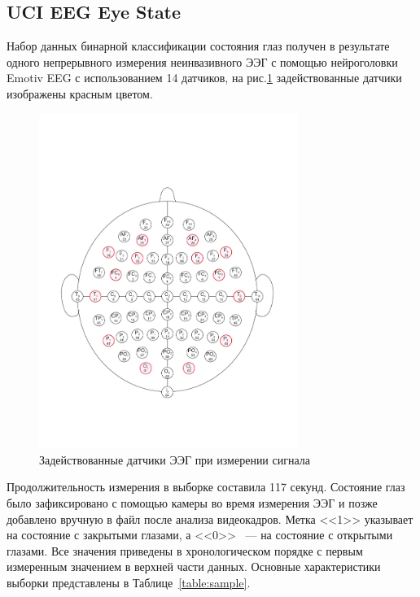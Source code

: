 \documentclass[a4paper, 12pt]{extarticle}
\begin{document}
\subsection{UCI EEG Eye State}
Набор данных бинарной классификации состояния глаз получен в результате одного непрерывного измерения неинвазивного ЭЭГ с 
помощью нейроголовки Emotiv EEG с использованием 14 датчиков, на рис.\ref{fig:1} задействованные датчики
изображены красным цветом. 
\begin{figure}[h]
	\centering
	\includegraphics[width=0.75\textwidth]{64_channel_sharbrough.pdf}
	\caption{Задействованные датчики ЭЭГ при измерении сигнала}
	\label{fig:1}
\end{figure}


Продолжительность измерения в выборке составила 117 секунд. 
Состояние глаз было зафиксировано с помощью камеры во время измерения ЭЭГ и позже добавлено 
вручную в файл после анализа видеокадров. Метка <<1>> указывает на состояние с закрытыми глазами, а 
<<0>> ~--- на состояние с открытыми глазами. Все значения приведены в хронологическом порядке с 
первым измеренным значением в верхней части данных.
Основные характеристики выборки представлены в
Таблице~\ref{table:sample}.
\end{document}
